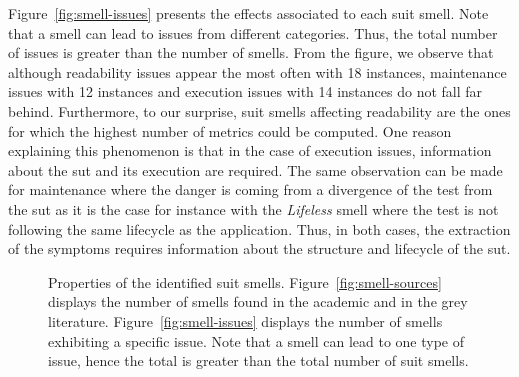 Figure~\ref{fig:smell-issues} presents the effects associated to each \gls{suit} smell. Note that a smell can lead to issues from different categories. Thus, the total number of issues is greater than the number of smells. From the figure, we observe that although readability issues appear the most often with 18 instances, maintenance issues with 12 instances and execution issues with 14 instances do not fall far behind. Furthermore, to our surprise, \gls{suit} smells affecting readability are the ones for which the highest number of metrics could be computed. One reason explaining this phenomenon is that in the case of execution issues, information about the \gls{sut} and its execution are required. The same observation can be made for maintenance where the danger is coming from a divergence of the test from the \gls{sut} as it is the case for instance with the \emph{Lifeless} smell \cite{Buwalda2015, Renaudin2016, Buwalda2019} where the test is not following the same lifecycle as the application. Thus, in both cases, the extraction of the symptoms requires information about the structure and lifecycle of the \gls{sut}.

\begin{figure}
\centering
{}
\caption{Properties of the identified \gls{suit} smells. Figure~\ref{fig:smell-sources} displays the number of smells found in the academic and in the grey literature. Figure~\ref{fig:smell-issues} displays the number of smells exhibiting a specific issue. Note that a smell can lead to one type of issue, hence the total is greater than the total number of \gls{suit} smells.}  
\label{fig:smells}
\end{figure}

